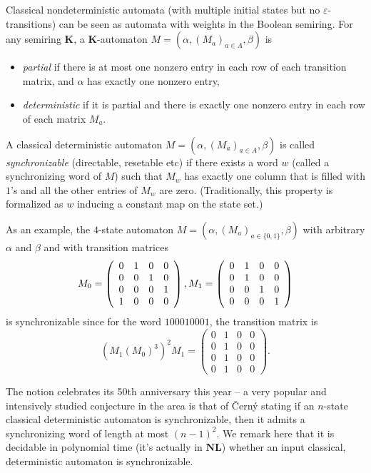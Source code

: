 \documentclass[submission,copyright,creativecommons]{eptcs}
\def\bK{{\mathbf{K}}}
\theoremstyle{plain}
\theoremstyle{definition}
\theoremstyle{remark}
\begin{document}
Classical nondeterministic automata (with multiple initial states but no $\varepsilon$-transitions)
can be seen as automata with weights in the Boolean semiring.
For any semiring $\bK$, a $\bK$-automaton $M=(\alpha,(M_a)_{a\in A},\beta)$ is
\begin{itemize}
\item \emph{partial} if there is at most one nonzero entry in each row of each transition matrix, and $\alpha$ has exactly one nonzero entry,
\item \emph{deterministic} if it is partial and there is exactly one nonzero entry in each row of each matrix $M_a$.
\end{itemize}
A classical deterministic automaton $M=(\alpha,(M_a)_{a\in A},\beta)$ is called
\emph{synchronizable} (directable, resetable etc) if there exists a word $w$ (called a synchronizing word of $M$) such that $M_w$
has exactly one column that is filled with $1$'s and all the other entries of $M_w$ are zero.
(Traditionally, this property is formalized as $w$ inducing a constant map on the state set.)

As an example, the $4$-state automaton $M=(\alpha,(M_a)_{a\in\{0,1\}},\beta)$ with arbitrary $\alpha$ and $\beta$ and with transition matrices
\[
M_0=\left(\begin{array}{llll}0&1&0&0\\0&0&1&0\\0&0&0&1\\1&0&0&0\end{array}\right),
\hfill M_1=\left(\begin{array}{llll}0&1&0&0\\0&1&0&0\\0&0&1&0\\0&0&0&1\end{array}\right)
\]
is synchronizable since for the word $100010001$, the transition matrix is
\[(M_1(M_0)^3)^2M_1=\left(\begin{array}{llll}0&1&0&0\\0&1&0&0\\0&1&0&0\\0&1&0&0\end{array}\right).\]

The notion celebrates its 50th anniversary this year -- a very popular and intensively studied conjecture in the area is that of
\v{C}ern\'y stating if an $n$-state classical deterministic automaton is synchronizable, then it admits a synchronizing word of length at most $(n-1)^2$.
We remark here that it is decidable in polynomial time (it's actually in $\mathbf{NL}$)
whether an input classical, deterministic automaton is synchronizable.
\end{document}
